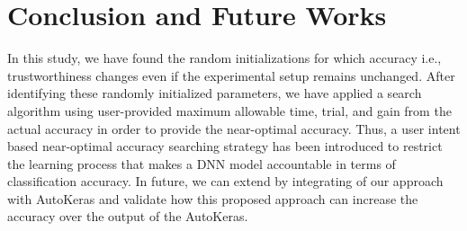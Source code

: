 \section{Conclusion and Future Works}
\label{sec:future}
In this study, we have found the random initializations for which accuracy i.e., trustworthiness changes even if the experimental setup remains unchanged. After identifying these randomly initialized parameters, we have applied a search algorithm using user-provided maximum allowable time, trial, and gain from the actual accuracy in order to provide the near-optimal accuracy.
Thus, a user intent based near-optimal accuracy searching strategy has been introduced to restrict the learning process that makes a DNN model accountable in terms of classification accuracy. In future, we can extend by integrating of our approach with AutoKeras \cite{jin2019auto} and validate how this proposed approach can increase the accuracy over the output of the AutoKeras.

